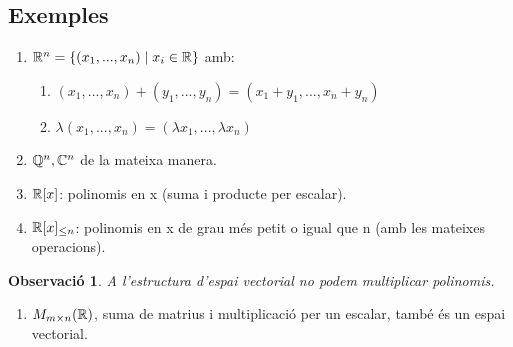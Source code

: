 \documentclass[a4paper, 11pt]{article}
\newtheorem*{obs}{Observació}
\begin{document}
\subsection*{Exemples}
\begin{enumerate}[$\bullet$]
	\item $\mathbb{R}^n = \{ (x_1, ..., x_n) \; | \; x_i \in \mathbb{R}\}$ amb:
	\begin{enumerate}[-]
		\item $(x_1, ..., x_n) + (y_1, ..., y_n) = (x_1 + y_1, ..., x_n + y_n)$
		\item$\lambda (x_1, ..., x_n) = (\lambda x_1, ..., \lambda x_n)$
	\end{enumerate}
	\item $\mathbb{Q}^n , \mathbb{C}^n$ de la mateixa manera.
	\item$\mathbb{R}[x]$: polinomis en x (suma i producte per escalar).
	\item $\mathbb{R}[x]_{\leq n}$: polinomis en x de grau més petit o igual que n (amb les mateixes operacions).
\end{enumerate}
\begin{obs}
A l'estructura d'espai vectorial no podem multiplicar polinomis.
\end{obs}
\begin{enumerate}[$\bullet$]
	\item $M_{m \times n} (\mathbb{R})$, suma de matrius i multiplicació per un escalar, també és un espai vectorial.
\end{enumerate}
\end{document}
